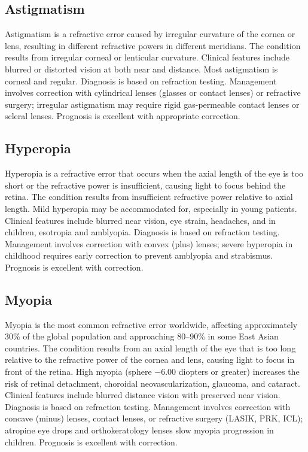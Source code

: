 

\label{sec:Refractive Errors}

\subsection{Astigmatism}
\label{sec:Astigmatism}
Astigmatism is a refractive error caused by irregular curvature of the cornea or lens, resulting in different refractive powers in different meridians. The condition results from irregular corneal or lenticular curvature. Clinical features include blurred or distorted vision at both near and distance. Most astigmatism is corneal and regular. Diagnosis is based on refraction testing. Management involves correction with cylindrical lenses (glasses or contact lenses) or refractive surgery; irregular astigmatism may require rigid gas-permeable contact lenses or scleral lenses. Prognosis is excellent with appropriate correction.

\subsection{Hyperopia}
\label{sec:Hyperopia}
Hyperopia is a refractive error that occurs when the axial length of the eye is too short or the refractive power is insufficient, causing light to focus behind the retina. The condition results from insufficient refractive power relative to axial length. Mild hyperopia may be accommodated for, especially in young patients. Clinical features include blurred near vision, eye strain, headaches, and in children, esotropia and amblyopia. Diagnosis is based on refraction testing. Management involves correction with convex (plus) lenses; severe hyperopia in childhood requires early correction to prevent amblyopia and strabismus. Prognosis is excellent with correction.

\subsection{Myopia}
\label{sec:Myopia}
Myopia is the most common refractive error worldwide, affecting approximately 30\% of the global population and approaching 80--90\% in some East Asian countries. The condition results from an axial length of the eye that is too long relative to the refractive power of the cornea and lens, causing light to focus in front of the retina. High myopia (sphere $-6.00$ diopters or greater) increases the risk of retinal detachment, choroidal neovascularization, glaucoma, and cataract. Clinical features include blurred distance vision with preserved near vision. Diagnosis is based on refraction testing. Management involves correction with concave (minus) lenses, contact lenses, or refractive surgery (LASIK, PRK, ICL); atropine eye drops and orthokeratology lenses slow myopia progression in children. Prognosis is excellent with correction.

